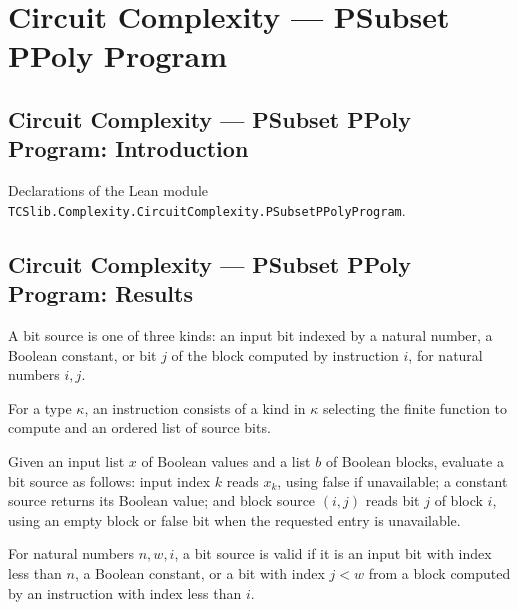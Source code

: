 \section{Circuit Complexity --- PSubset PPoly Program}
\subsection*{Circuit Complexity --- PSubset PPoly Program: Introduction}

Declarations of the Lean module \texttt{TCSlib.Complexity.CircuitComplexity.PSubsetPPolyProgram}.

\subsection*{Circuit Complexity --- PSubset PPoly Program: Results}

\begin{definition}
\label{BoolCircuit.BitSrc}
\leanok
A bit source is one of three kinds: an input bit indexed by a natural number, a Boolean
constant, or bit $j$ of the block computed by instruction $i$, for natural numbers
$i,j$.
\end{definition}

\begin{definition}
\label{BoolCircuit.GInstr}
\leanok
{}
For a type $\kappa$, an instruction consists of a kind in $\kappa$ selecting the finite
function to compute and an ordered list of source bits.
\end{definition}

\begin{definition}
\label{BoolCircuit.BitSrc.eval}
\leanok
{}
Given an input list $x$ of Boolean values and a list $b$ of Boolean blocks, evaluate a
bit source as follows: input index $k$ reads $x_k$, using false if unavailable; a
constant source returns its Boolean value; and block source $(i,j)$ reads bit $j$ of
block $i$, using an empty block or false bit when the requested entry is unavailable.
\end{definition}

\begin{definition}
\label{BoolCircuit.BitSrc.Valid}
\leanok
{}
For natural numbers $n,w,i$, a bit source is valid if it is an input bit with index less
than $n$, a Boolean constant, or a bit with index $j<w$ from a block computed by an
instruction with index less than $i$.
\end{definition}

